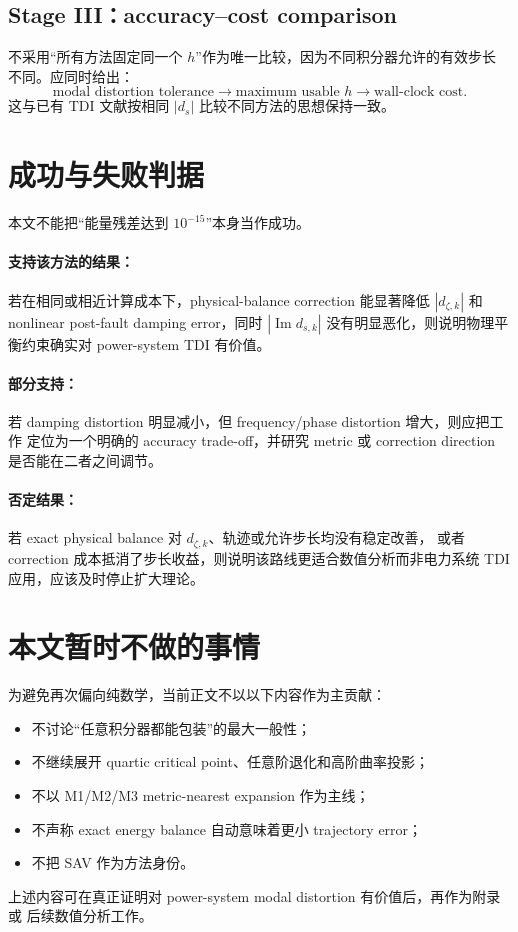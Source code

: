 \documentclass[UTF8,11pt,a4paper]{ctexart}
\begin{document}
\subsection{Stage III：accuracy--cost comparison}

不采用“所有方法固定同一个 \(h\)”作为唯一比较，因为不同积分器允许的有效步长
不同。应同时给出：
\begin{equation}
  \text{modal distortion tolerance}
  \longrightarrow
  \text{maximum usable }h
  \longrightarrow
  \text{wall-clock cost}.
\end{equation}
这与已有 TDI 文献按相同 \(|d_s|\) 比较不同方法的思想保持一致。

\section{成功与失败判据}

本文不能把“能量残差达到 \(10^{-15}\)”本身当作成功。

\paragraph{支持该方法的结果：}
若在相同或相近计算成本下，physical-balance correction 能显著降低
\(
|d_{\zeta,k}|
\)
和 nonlinear post-fault damping error，同时
\(
|\operatorname{Im}d_{s,k}|
\)
没有明显恶化，则说明物理平衡约束确实对 power-system TDI 有价值。

\paragraph{部分支持：}
若 damping distortion 明显减小，但 frequency/phase distortion 增大，则应把工作
定位为一个明确的 accuracy trade-off，并研究 metric 或 correction direction
是否能在二者之间调节。

\paragraph{否定结果：}
若 exact physical balance 对 \(d_{\zeta,k}\)、轨迹或允许步长均没有稳定改善，
或者 correction 成本抵消了步长收益，则说明该路线更适合数值分析而非电力系统
TDI 应用，应该及时停止扩大理论。

\section{本文暂时不做的事情}

为避免再次偏向纯数学，当前正文不以以下内容作为主贡献：
\begin{itemize}
  \item 不讨论“任意积分器都能包装”的最大一般性；
  \item 不继续展开 quartic critical point、任意阶退化和高阶曲率投影；
  \item 不以 M1/M2/M3 metric-nearest expansion 作为主线；
  \item 不声称 exact energy balance 自动意味着更小 trajectory error；
  \item 不把 SAV 作为方法身份。
\end{itemize}
上述内容可在真正证明对 power-system modal distortion 有价值后，再作为附录或
后续数值分析工作。
\end{document}
